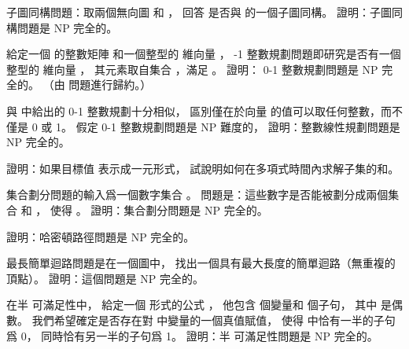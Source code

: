 \startsection[
  title={NP-complete problems},
]

\startEXERCISE
{\EMP 子圖同構問題}：取兩個無向圖  和 ，
回答  是否與  的一個子圖同構。
證明：子圖同構問題是 NP 完全的。
\stopEXERCISE

\startANSWER
{}
\stopANSWER

\startEXERCISE[exercise:34.5-2]
給定一個  的整數矩陣  和一個整型的  維向量 ，
 {-1 整數規劃問題}即研究是否有一個整型的  維向量 ，
其元素取自集合 ，滿足 。
證明： 0-1 整數規劃問題是 NP 完全的。
（\hint 由  問題進行歸約。）
\stopEXERCISE

\startANSWER
{}
\stopANSWER

與 中給出的 0-1 整數規劃十分相似，
區別僅在於向量  的值可以取任何整數，而不僅是 0 或 1。
假定 0-1 整數規劃問題是 NP 難度的，
證明：整數線性規劃問題是 NP 完全的。
\stopEXERCISE

\startANSWER
{}
\stopANSWER

\startEXERCISE
證明：如果目標值  表示成一元形式，
試說明如何在多項式時間內求解子集的和。
\stopEXERCISE

\startANSWER
{}
\stopANSWER

\startEXERCISE
{\EMP 集合劃分問題}的輸入爲一個數字集合 。
問題是：這些數字是否能被劃分成兩個集合  和 ，
使得 。
證明：集合劃分問題是 NP 完全的。
\stopEXERCISE

\startANSWER
{}
\stopANSWER

\startEXERCISE
證明：哈密頓路徑問題是 NP 完全的。
\stopEXERCISE

\startANSWER
{}
\stopANSWER

\startEXERCISE
{\EMP 最長簡單迴路問題}是在一個圖中，
找出一個具有最大長度的簡單迴路（無重複的頂點）。
證明：這個問題是 NP 完全的。
\stopEXERCISE

\startANSWER
{}
\stopANSWER

\startEXERCISE
在{\EMP 半  可滿足性}中，
給定一個  形式的公式 \m{\phi}，
他包含  個變量和  個子句，
其中  是偶數。
我們希望確定是否存在對 \m{\phi} 中變量的一個真值賦值，
使得 \m{\phi} 中恰有一半的子句爲 0，
同時恰有另一半的子句爲 1。
證明：半  可滿足性問題是 NP 完全的。
\stopEXERCISE

\startANSWER
{}
\stopANSWER

\stopsection
